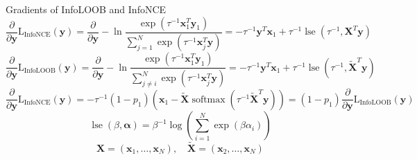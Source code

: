 \documentclass[utf8,aspectratio=169,ngerman,english,usenames,dvipsnames]{beamer}
\begin{document}
\begin{frame}{Gradients of InfoLOOB and InfoNCE}
    \footnotesize
    \begin{equation*}
        \frac{\partial}{\partial \mathbf{y}} \operatorname{L_{InfoNCE}}(\mathbf{y})
        = \frac{\partial}{\partial \mathbf{y}} - \ln \frac{\exp(\tau^{-1} \mathbf{x}_1^T \mathbf{y}_1)}{\textstyle\sum_{j=1}^{N} \exp(\tau^{-1} \mathbf{x}_j^T \mathbf{y})}
        = - \tau^{-1} \mathbf{y}^T \mathbf{x}_1 + \tau^{-1} \operatorname{lse}(\tau^{-1}, \mathbf{X}^T \mathbf{y})
    \end{equation*}
    \begin{equation*}
        \frac{\partial}{\partial \mathbf{y}} \operatorname{L_{InfoLOOB}}(\mathbf{y})
        = \frac{\partial}{\partial \mathbf{y}} - \ln \frac{\exp(\tau^{-1} \mathbf{x}_1^T \mathbf{y}_1)}{\textstyle\sum_{j \neq i}^{N} \exp(\tau^{-1} \mathbf{x}_j^T \mathbf{y})}
        = - \tau^{-1} \mathbf{y}^T \mathbf{x}_1 + \tau^{-1} \operatorname{lse}(\tau^{-1}, \tilde{\mathbf{X}}^T \mathbf{y})
    \end{equation*}
    \begin{equation*}
        \frac{\partial}{\partial \mathbf{y}} \operatorname{L_{InfoNCE}}(\mathbf{y})
        = - \tau^{-1} (1 - p_1) (\mathbf{x}_1 - \tilde{\mathbf{X}} \operatorname{softmax}(\tau^{-1} \tilde{\mathbf{X}}^T \mathbf{y}))
        = (1-p_1) \frac{\partial}{\partial \mathbf{y}} \operatorname{L_{InfoLOOB}}(\mathbf{y})
    \end{equation*}
    \begin{equation*}
        \operatorname{lse}(\beta, \boldsymbol{\alpha}) = \beta^{-1} \log \left( \sum_{i=1}^{N}\exp(\beta \alpha_i) \right)
    \end{equation*}
    \begin{equation*}
        \mathbf{X} = (\mathbf{x}_1, \dots, \mathbf{x}_N), \quad \tilde{\mathbf{X}} = (\mathbf{x}_2, \dots, \mathbf{x}_N)
    \end{equation*}
\end{frame}

\addtocounter{framenumber}{-5}
\end{document}
